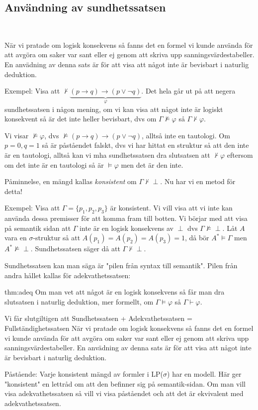 \subsection{Användning av sundhetssatsen}\hfill\\
\par\bigskip
\noindent När vi pratade om logisk konsekvens så fanns det en formel vi kunde använda för att avgöra om saker var sant eller ej genom att skriva upp sanningsvärdestabeller. En anvädning av denna sats är för att visa att något inte är bevisbart i naturlig deduktion.
\par\bigskip
\noindent Exempel: Visa att $\nvdash\underbrace{(p\rightarrow q)\rightarrow(p\vee\neg q)}_{\text{$\varphi$}}$. Det hela går ut på att negera sundhetssatsen i någon mening, om vi kan visa att något inte är logiskt konsekvent så är det inte heller bevisbart, dvs om $\Gamma\nvDash\varphi$ så $\Gamma\nvdash\varphi$.\par
\noindent Vi visar $\nvDash\varphi$, dvs $\nvDash(p\rightarrow q)\rightarrow(p\vee\neg q)$, alltså inte en tautologi. Om $p=0, q = 1$ så är påståendet falskt, dvs vi har hittat en struktur så att den inte är en tautologi, alltså kan vi mha sundhetssatsen dra slutsatsen att $\nvdash\varphi$ eftersom om det inte är en tautologi så är $\vDash\varphi$ men det är den inte.
\par\bigskip
\noindent Påminnelse, en mängd kallas \textit{konsistent} om $\Gamma\nvdash\perp$. Nu har vi en metod för detta!
\par\bigskip
\noindent Exempel: Visa att $\Gamma = \{p_1,p_2,p_3\}$ är konsistent. Vi vill visa att vi inte kan använda dessa premisser för att komma fram till botten. Vi börjar med att visa på semantik sidan att $\Gamma$ inte är en logisk konsekvens av $\perp$ dvs $\Gamma\nvDash\perp$. Låt $A$ vara en $\sigma$-struktur så att $A(p_1)=A(p_2)=A(p_3)=1$, då bör $A^*\vDash\Gamma$ men $A^*\nvDash\perp$. Sundhetssatsen säger då att $\Gamma\nvdash\perp$.
\par\bigskip
\noindent Sundhetssatsen kan man säga är "pilen från syntax till semantik". Pilen från andra hållet kallas för adekvathetssatsen:
\par\bigskip

\begin{theo}[Adekvathetssatsen]{thm:adeq}
  Om man vet att något är en logisk konsekvens så får man dra slutsatsen i naturlig deduktion, mer formellt, om $\Gamma\vDash\varphi$ så $\Gamma\vdash\varphi$. 
\end{theo}
\par\bigskip
\noindent Vi får slutgiltigen att Sundhetssatsen + Adekvathetssatsen = Fullständighetssatsen När vi pratade om logisk konsekvens så fanns det en formel vi       kunde använda för att avgöra om saker var sant eller ej genom att skriva       upp sanningsvärdestabeller. En anvädning av denna sats är för att visa       att något inte är bevisbart i naturlig deduktion.
\par\bigskip
\noindent Påstående: Varje konsistent mängd av formler i LP($\sigma$) har en modell. Här ger "konsistent" en lettråd om att den befinner sig på semantik-sidan. Om man vill visa adekvathetssatsen så vill vi visa påståendet och att det är ekvivalent med adekvathetssatsen.
